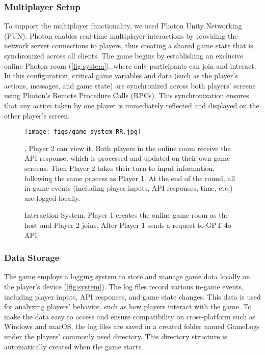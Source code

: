 \subsubsection{Multiplayer Setup}
To support the multiplayer functionality, we used Photon Unity Networking (PUN). Photon enables real-time multiplayer interactions by providing the network server connections to players, thus creating a shared game state that is synchronized across all clients. The game begins by establishing an exclusive online Photon room (\autoref{fig:system}), where only participants can join and interact. %
In this configuration, critical game variables and data (such as the player’s actions, messages, and game state) are synchronized across both players' screens using Photon’s Remote Procedure Calls (RPCs). This synchronization ensures that any action taken by one player is immediately reflected and displayed on the other player’s screen.%
\begin{figure}
    \centering
    \texttt{[image: figs/game\_system\_RR.jpg]}
    \caption{Interaction System. Player 1 creates the online game room as the host and Player 2 joins. After Player 1 sends a request to GPT-4o API}, Player 2 can view it. Both players in the online room receive the API response, which is processed and updated on their own game screens. Then Player 2 takes their turn to input information, following the same process as Player 1. At the end of the round, all in-game events (including player inputs, API responses, time, etc.) are logged locally.
    \label{fig:system}
\end{figure}
\subsubsection{Data Storage}
The game employs a logging system to store and manage game data locally on the player's device (\autoref{fig:system}). The log files record various in-game events, including player inputs, API responses, and game state changes. This data is used for analyzing players’ behavior, such as how players interact with the game. To make the data easy to access and ensure compatibility on cross-platform such as Windows and macOS, the log files are saved in a created folder named GameLogs under the players’ commonly used directory. This directory structure is automatically created when the game starts.%